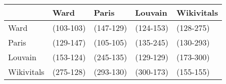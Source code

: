 \begin{tabular}{lllll}
\toprule
{} &       Ward &      Paris &    Louvain & Wikivitals \\
\midrule
Ward       &  (103-103) &  (147-129) &  (124-153) &  (128-275) \\
Paris      &  (129-147) &  (105-105) &  (135-245) &  (130-293) \\
Louvain    &  (153-124) &  (245-135) &  (129-129) &  (173-300) \\
Wikivitals &  (275-128) &  (293-130) &  (300-173) &  (155-155) \\
\bottomrule
\end{tabular}
